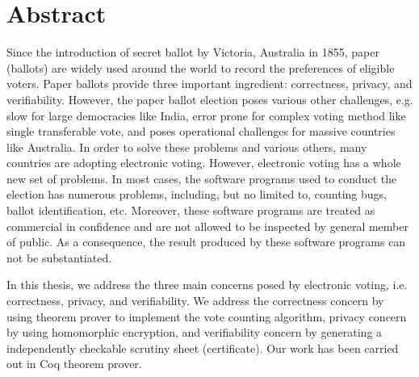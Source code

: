 \chapter*{Abstract}
\setlength{\parindent}{2em}
\setlength{\parskip}{1em}



Since the introduction of secret ballot by Victoria, Australia in 1855, 
paper (ballots) are widely used around the world to record 
the preferences of eligible voters. Paper ballots provide three 
important ingredient: correctness, privacy, and verifiability. 
However, the paper ballot election poses various  other challenges, e.g. 
slow for large democracies like India,  error prone for complex voting method 
like single transferable vote, and poses operational challenges for 
massive countries like Australia. In order to solve these problems and various others, 
many countries are adopting electronic voting. However, 
electronic voting has a whole new set of problems. In most cases, the software 
programs used to conduct the election has numerous problems, including, but no limited to, 
counting bugs, ballot identification, etc. Moreover, 
these software programs are treated as commercial in confidence and 
are not allowed to be inspected by general member of public. 
As a consequence, the result produced by these software programs 
can not be substantiated.

In this thesis, we address the three main concerns posed by electronic voting, i.e. 
correctness, privacy, and verifiability. We address the correctness concern by using 
theorem prover to implement the vote counting algorithm, 
privacy concern by using homomorphic encryption, and verifiability concern 
by generating a independently checkable scrutiny sheet (certificate). Our work 
has been carried out in Coq theorem prover.

